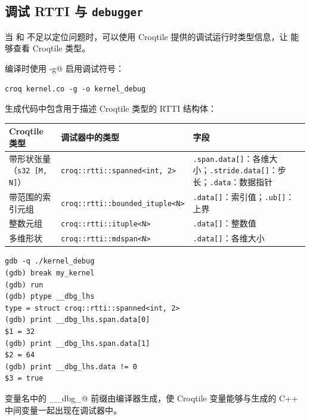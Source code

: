 \subsection*{调试 RTTI 与 \texttt{debugger}}

当 \co@print@ 和 \co@println@ 不足以定位问题时，可以使用 Croqtile 提供的调试运行时类型信息，让 \co@debugger@ 能够查看 Croqtile 类型。

编译时使用 \co@-g@ 启用调试符号：

\begin{lstlisting}[language=croqtile,caption={生成带调试符号的程序}]
croq kernel.co -g -o kernel_debug
\end{lstlisting}

生成代码中包含用于描述 Croqtile 类型的 RTTI 结构体：

\begin{table}[htbp]\centering\small
\begin{tabularx}{\linewidth}{@{}lXX@{}}
\toprule
\textbf{Croqtile 类型} & \textbf{调试器中的类型} & \textbf{字段} \\
\midrule
带形状张量（\texttt{s32 [M, N]}） & \texttt{croq::rtti::spanned\textless{}int, 2\textgreater{}} & \texttt{.span.data[]}：各维大小；\texttt{.stride.data[]}：步长；\texttt{.data}：数据指针 \\
带范围的索引元组 & \texttt{croq::rtti::bounded\_ituple\textless{}N\textgreater{}} & \texttt{.data[]}：索引值；\texttt{.ub[]}：上界 \\
整数元组 & \texttt{croq::rtti::ituple\textless{}N\textgreater{}} & \texttt{.data[]}：整数值 \\
多维形状 & \texttt{croq::rtti::mdspan\textless{}N\textgreater{}} & \texttt{.data[]}：各维大小 \\
\bottomrule
\end{tabularx}
\end{table}

\begin{lstlisting}[language=croqtile,caption={在调试器中查看变量}]
gdb -q ./kernel_debug
(gdb) break my_kernel
(gdb) run
(gdb) ptype __dbg_lhs
type = struct croq::rtti::spanned<int, 2>
(gdb) print __dbg_lhs.span.data[0]
$1 = 32
(gdb) print __dbg_lhs.span.data[1]
$2 = 64
(gdb) print __dbg_lhs.data != 0
$3 = true
\end{lstlisting}

变量名中的 \co@__dbg_@ 前缀由编译器生成，使 Croqtile 变量能够与生成的 C++ 中间变量一起出现在调试器中。
